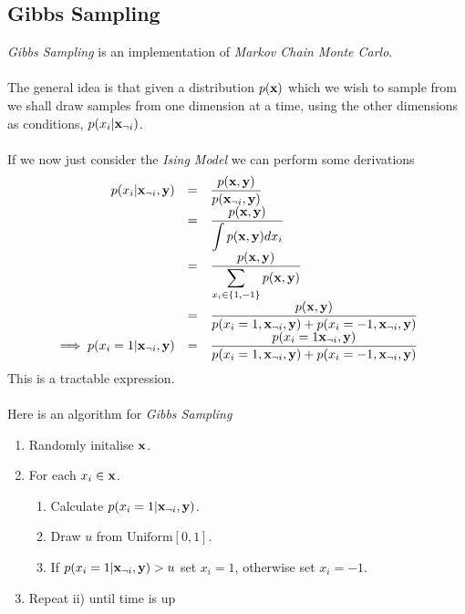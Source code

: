 \documentclass[11pt,a4paper]{article}
\begin{document}
\subsection{Gibbs Sampling}
\textit{Gibbs Sampling} is an implementation of \textit{Markov Chain Monte Carlo}.\\
\\
The general idea is that given a distribution $p(\textbf{x})$ which we wish to sample from we shall draw samples from one dimension at a time, using the other dimensions as conditions, $p(x_i|\textbf{x}_{\neg i})$.\\
\\
If we now just consider the \textit{Ising Model} we can perform some derivations
\[\begin{array}{rcl}
p(x_i|\textbf{x}_{\neg i},\textbf{y})&=&\dfrac{p(\textbf{x},\textbf{y})}{p(\textbf{x}_{\neg i},\textbf{y})}\\
&=&\dfrac{p(\textbf{x},\textbf{y})}{\displaystyle\int p(\textbf{x},\textbf{y})dx_i}\\
&=&\dfrac{p(\textbf{x},\textbf{y})}{\displaystyle\sum_{x_i\in\{1,-1\}} p(\textbf{x},\textbf{y})}\\
&=&\dfrac{p(\textbf{x},\textbf{y})}{p(x_i=1,\textbf{x}_{\neg i},\textbf{y})+p(x_i=-1,\textbf{x}_{\neg i},\textbf{y})}\\
\implies p(x_i=1|\textbf{x}_{\neg i},\textbf{y})&=&\dfrac{p(x_i=1\textbf{x}_{\neg i},\textbf{y})}{p(x_i=1,\textbf{x}_{\neg i},\textbf{y})+p(x_i=-1,\textbf{x}_{\neg i},\textbf{y})}\\
\end{array}\]
This is a tractable expression.\\
\\
Here is an algorithm for \textit{Gibbs Sampling}
\begin{enumerate}
	\item Randomly initalise $\textbf{x}$.
	\item For each $x_i\in\textbf{x}$.
	\begin{enumerate}
		\item Calculate $p(x_i=1|\textbf{x}_{\neg i},\textbf{y})$.
		\item Draw $u$ from $\text{Uniform}[0,1]$.
		\item If $p(x_i=1|\textbf{x}_{\neg i},\textbf{y})>u$ set $x_i=1$, otherwise set $x_i=-1$.
	\end{enumerate}
	\item Repeat ii) until time is up
\end{enumerate}
\end{document}
